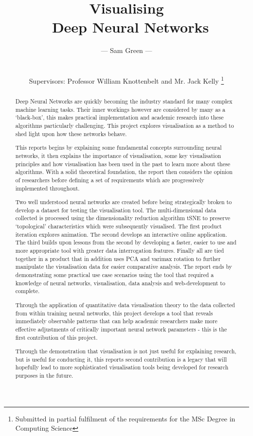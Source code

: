 \documentclass[a4paper,11pt,titlepage]{article}
\title{Visualising 
		\\\ Deep Neural Networks
		}
\author{
 \Large{--- Sam Green ---}
 \\
 \\
 \\
 \small{Supervisors: Professor William Knottenbelt and Mr. Jack Kelly}
\thanks{Submitted in partial fulfilment of the requirements for the MSc Degree in Computing Science}
}
\begin{document}
\onehalfspacing

\maketitle

\clearpage
\clearpage
\thispagestyle{plain}
\null\newpage

\begin{abstract}
Deep Neural Networks are quickly becoming the industry standard for many complex machine learning tasks. Their inner workings however are considered by many as a `black-box', this makes practical implementation and academic research into these algorithms particularly challenging. This project explores visualisation as a method to shed light upon how these networks behave. 
\par 
This reports begins by explaining some fundamental concepts surrounding neural networks, it then explains the importance of visualisation, some key visualisation principles and how visualisation has been used in the past to learn more about these algorithms. With a solid theoretical foundation, the report then considers the opinion of researchers before defining a set of requirements which are progressively implemented throughout.
\par 
Two well understood neural networks are created before being strategically broken to develop a dataset for testing the visualisation tool. The multi-dimensional data collected is processed using the dimensionality reduction algorithm tSNE to preserve `topological' characteristics which were subsequently visualised.
The first product iteration explores animation. The second develops an interactive online application. The third builds upon lessons from the second by developing a faster, easier to use and more appropriate tool with greater data interrogation features. Finally all are tied together in a product that in addition uses PCA and varimax rotation to further manipulate the visualisation data for easier comparative analysis. The report ends by demonstrating some practical use case scenarios using the tool that required a knowledge of neural networks, visualisation, data analysis and web-development to complete.
\par 
Through the application of quantitative data visualisation theory to the data collected from within training neural networks, this project develops a tool that reveals immediately observable patterns that can help academic researchers make more effective adjustments of critically important neural network parameters - this is the first contribution of this project.
\par 
Through the demonstration that visualisation is not just useful for explaining research, but is useful for conducting it, this reports second contribution is a legacy that will hopefully lead to more sophisticated visualisation tools being developed for research purposes in the future.

\end{abstract}
\end{document}
